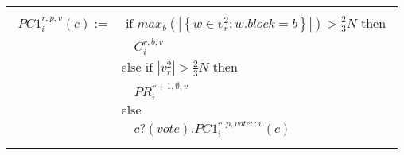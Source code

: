 \documentclass[12pt]{report}
\renewcommand{\|}{\;|\;}
\begin{document}
\begin{center}
\begin{tabular}{l }
		\hline \\
		{$\!\begin{aligned}
		PC1_i^{r,p,v}(c) := 
			& \text{ if } max_{b}(|\left\{ w \in v_r^2 : w.block = b\right\}|) > \frac{2}{3} N \text{ then} \\
				& \quad C_i^{r,b,v} \\
			& \text{else if }  | v_r^2 | > \frac{2}{3} N \text{ then} \\ 
				& \quad PR_i^{r+1,\emptyset,v} \\ 
			& \text{else} \\
				& \quad c?(vote) . PC1_i^{r,p,vote::v}(c) \\
		\end{aligned}$}


	\end{tabular}
\end{center}
\end{document}
